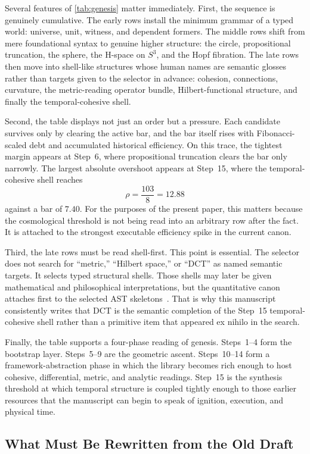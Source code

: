 \documentclass[11pt,a4paper]{article}
\theoremstyle{plain}
\theoremstyle{definition}
\theoremstyle{remark}
\begin{document}
Several features of \cref{tab:genesis} matter immediately.
First, the sequence is genuinely cumulative.
The early rows install the minimum grammar of a typed world: universe, unit, witness, and dependent formers.
The middle rows shift from mere foundational syntax to genuine higher structure: the circle, propositional truncation, the sphere, the H-space on $S^3$, and the Hopf fibration.
The late rows then move into shell-like structures whose human names are semantic glosses rather than targets given to the selector in advance: cohesion, connections, curvature, the metric-reading operator bundle, Hilbert-functional structure, and finally the temporal-cohesive shell.

Second, the table displays not just an order but a pressure.
Each candidate survives only by clearing the active bar, and the bar itself rises with Fibonacci-scaled debt and accumulated historical efficiency.
On this trace, the tightest margin appears at Step~6, where propositional truncation clears the bar only narrowly.
The largest absolute overshoot appears at Step~15, where the temporal-cohesive shell reaches
\[
    \rho = \frac{103}{8} = 12.88
\]
against a bar of $7.40$.
For the purposes of the present paper, this matters because the cosmological threshold is not being read into an arbitrary row after the fact.
It is attached to the strongest executable efficiency spike in the current canon.

Third, the late rows must be read shell-first.
This point is essential.
The selector does not search for ``metric,'' ``Hilbert space,'' or ``DCT'' as named semantic targets.
It selects typed structural shells.
Those shells may later be given mathematical and philosophical interpretations, but the quantitative canon attaches first to the selected AST skeletons~\cite{pen}.
That is why this manuscript consistently writes that DCT is the semantic completion of the Step~15 temporal-cohesive shell rather than a primitive item that appeared ex nihilo in the search.

Finally, the table supports a four-phase reading of genesis.
Steps~1--4 form the bootstrap layer.
Steps~5--9 are the geometric ascent.
Steps~10--14 form a framework-abstraction phase in which the library becomes rich enough to host cohesive, differential, metric, and analytic readings.
Step~15 is the synthesis threshold at which temporal structure is coupled tightly enough to those earlier resources that the manuscript can begin to speak of ignition, execution, and physical time.

\subsection{What Must Be Rewritten from the Old Draft}
\label{subsec:rewrite-notes}
\end{document}
